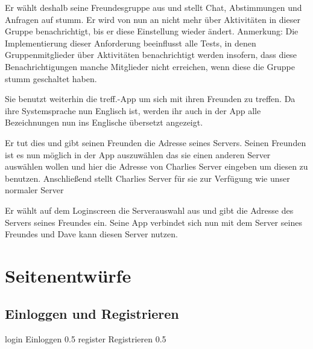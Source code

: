 \documentclass[parskip=full,11pt]{scrartcl}
\newcommand\producttitle{treff.}
\begin{document}
{Er wählt deshalb seine Freundesgruppe aus und stellt Chat, Abstimmungen und Anfragen auf stumm.}
{Er wird von nun an nicht mehr über Aktivitäten in dieser Gruppe benachrichtigt,
bis er diese Einstellung wieder ändert.}
Anmerkung: Die Implementierung dieser Anforderung beeinflusst alle Tests, in denen
Gruppenmitglieder über Aktivitäten benachrichtigt werden insofern, dass diese Benachrichtigungen
manche Mitglieder nicht erreichen, wenn diese die Gruppe stumm geschaltet haben.

{Sie benutzt weiterhin die \producttitle-App um sich mit ihren Freunden zu treffen.}
{Da ihre Systemsprache nun Englisch ist, werden ihr auch in der App alle Bezeichnungen
nun ins Englische übersetzt angezeigt.}

{Er tut dies und gibt seinen Freunden die Adresse seines Servers.}
{Seinen Freunden ist es nun möglich in der App auszuwählen das sie einen anderen Server auswählen wollen und hier die Adresse von
Charlies Server eingeben um diesen zu benutzen. Anschließend stellt Charlies Server für sie zur Verfügung wie unser normaler Server}


{Er wählt auf dem Loginscreen die Serverauswahl aus und gibt die Adresse des Servers seines Freundes ein.}
{Seine App verbindet sich nun mit dem Server seines Freundes und Dave kann diesen Server nutzen.}

\pagebreak
\appendix

\section{Seitenentwürfe}

\subsection{Einloggen und Registrieren}
{login}
{Einloggen}
{0.5}
{register}
{Registrieren}
{0.5}
\end{document}
